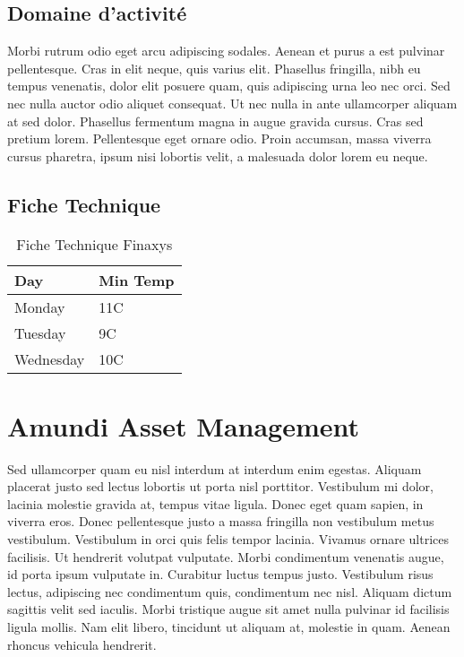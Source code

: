
\subsection{Domaine d'activité}
Morbi rutrum odio eget arcu adipiscing sodales. Aenean et purus a est pulvinar pellentesque. Cras in elit neque, quis varius elit. Phasellus fringilla, nibh eu tempus venenatis, dolor elit posuere quam, quis adipiscing urna leo nec orci. Sed nec nulla auctor odio aliquet consequat. Ut nec nulla in ante ullamcorper aliquam at sed dolor. Phasellus fermentum magna in augue gravida cursus. Cras sed pretium lorem. Pellentesque eget ornare odio. Proin accumsan, massa viverra cursus pharetra, ipsum nisi lobortis velit, a malesuada dolor lorem eu neque.

\subsection{Fiche Technique}
\begin{table}[htp]
    \begin{center}
        \begin{tabular}{ | l | l |}
            \hline
            Day & Min Temp  \\ \hline
            Monday & 11C \\ \hline
            Tuesday & 9C  \\ \hline
            Wednesday & 10C  \\
            \hline
            \end{tabular}
            \caption{Fiche Technique Finaxys}
    \end{center}
\end{table}


\section{Amundi Asset Management}

Sed ullamcorper quam eu nisl interdum at interdum enim egestas. Aliquam placerat justo sed lectus lobortis ut porta nisl porttitor. Vestibulum mi dolor, lacinia molestie gravida at, tempus vitae ligula. Donec eget quam sapien, in viverra eros. Donec pellentesque justo a massa fringilla non vestibulum metus vestibulum. Vestibulum in orci quis felis tempor lacinia. Vivamus ornare ultrices facilisis. Ut hendrerit volutpat vulputate. Morbi condimentum venenatis augue, id porta ipsum vulputate in. Curabitur luctus tempus justo. Vestibulum risus lectus, adipiscing nec condimentum quis, condimentum nec nisl. Aliquam dictum sagittis velit sed iaculis. Morbi tristique augue sit amet nulla pulvinar id facilisis ligula mollis. Nam elit libero, tincidunt ut aliquam at, molestie in quam. Aenean rhoncus vehicula hendrerit.
